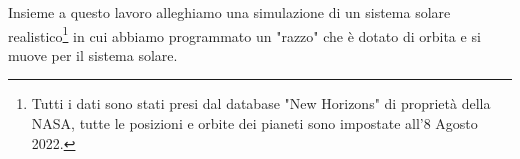 Insieme a questo lavoro alleghiamo una simulazione di un sistema solare realistico\footnote{Tutti i dati sono stati presi dal database "New Horizons" di proprietà della NASA, tutte le posizioni e orbite dei pianeti sono impostate all'8 Agosto 2022.} in cui abbiamo programmato un "razzo" che è dotato di orbita e si muove per il sistema solare.\\
